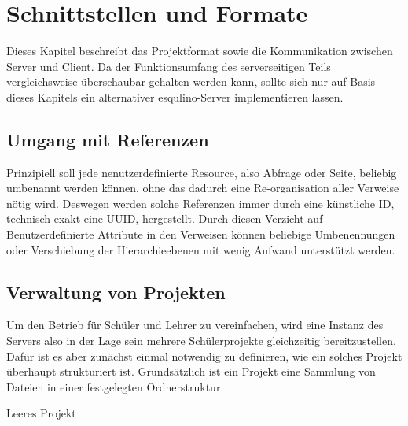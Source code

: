 \section{Schnittstellen und Formate}

Dieses Kapitel beschreibt das Projektformat sowie die Kommunikation zwischen Server und Client. Da der Funktionsumfang des serverseitigen Teils vergleichsweise überschaubar gehalten werden kann, sollte sich nur auf Basis dieses Kapitels ein alternativer esqulino-Server implementieren lassen.

\subsection{Umgang mit Referenzen}

Prinzipiell soll jede nenutzerdefinierte Resource, also Abfrage oder Seite, beliebig umbenannt werden können, ohne das dadurch eine Re-organisation aller Verweise nötig wird. Deswegen werden solche Referenzen immer durch eine künstliche ID, technisch exakt eine UUID, hergestellt. Durch diesen Verzicht auf Benutzerdefinierte Attribute in den Verweisen können beliebige Umbenennungen oder Verschiebung der Hierarchieebenen mit wenig Aufwand unterstützt werden.

\subsection{Verwaltung von Projekten}

Um den Betrieb für Schüler und Lehrer zu vereinfachen, wird eine Instanz des Servers also in der Lage sein mehrere Schülerprojekte gleichzeitig bereitzustellen. Dafür ist es aber zunächst einmal notwendig zu definieren, wie ein solches Projekt überhaupt strukturiert ist. Grundsätzlich ist ein Projekt eine Sammlung von Dateien in einer festgelegten Ordnerstruktur.

\begin{dirstruct}
  \caption{Leeres Projekt}
\end{dirstruct}



